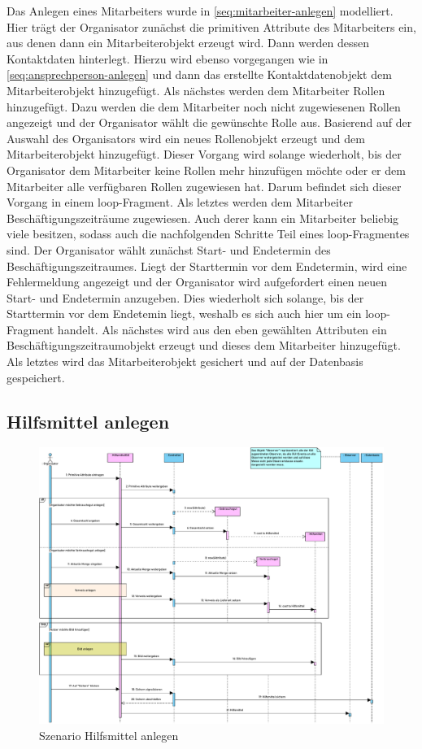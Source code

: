 Das Anlegen eines Mitarbeiters wurde in \autoref{seq:mitarbeiter-anlegen} modelliert. Hier trägt der Organisator zunächst die primitiven Attribute des Mitarbeiters ein, aus denen dann ein Mitarbeiterobjekt erzeugt wird. Dann werden dessen Kontaktdaten hinterlegt. Hierzu wird ebenso vorgegangen wie in \autoref{seq:ansprechperson-anlegen} und dann das erstellte Kontaktdatenobjekt dem Mitarbeiterobjekt hinzugefügt. Als nächstes werden dem Mitarbeiter Rollen hinzugefügt. Dazu werden die dem Mitarbeiter noch nicht zugewiesenen Rollen angezeigt und der Organisator wählt die gewünschte Rolle aus. Basierend auf der Auswahl des Organisators wird ein neues Rollenobjekt erzeugt und dem Mitarbeiterobjekt hinzugefügt. Dieser Vorgang wird solange wiederholt, bis der Organisator dem Mitarbeiter keine Rollen mehr hinzufügen möchte oder er dem Mitarbeiter alle verfügbaren Rollen zugewiesen hat. Darum befindet sich dieser Vorgang in einem loop-Fragment. Als letztes werden dem Mitarbeiter Beschäftigungszeiträume zugewiesen. Auch derer kann ein Mitarbeiter beliebig viele besitzen, sodass auch die nachfolgenden Schritte Teil eines loop-Fragmentes sind. Der Organisator wählt zunächst Start- und Endetermin des Beschäftigungszeitraumes. Liegt der Starttermin vor dem Endetermin, wird eine Fehlermeldung angezeigt und der Organisator wird aufgefordert einen neuen Start- und Endetermin anzugeben. Dies wiederholt sich solange, bis der Starttermin vor dem Endetemin liegt, weshalb es sich auch hier um ein loop-Fragment handelt. Als nächstes wird aus den eben gewählten Attributen ein Beschäftigungszeitraumobjekt erzeugt und dieses dem Mitarbeiter hinzugefügt. Als letztes wird das Mitarbeiterobjekt gesichert und auf der Datenbasis gespeichert.

\FloatBarrier

\subsection{Hilfsmittel anlegen}

\begin{figure}[ht!]
    \centering
    \includegraphics[width=0.98\columnwidth]{Bilder/seq_Hilfsmittel_anlegen.pdf}
    \caption{Szenario Hilfsmittel anlegen}
    \label{seq:hilfsmittel-anlegen}
\end{figure}


